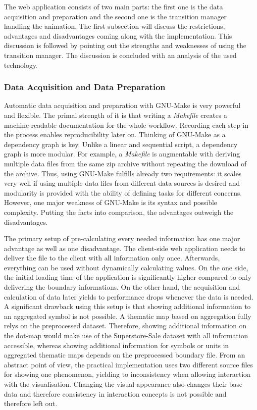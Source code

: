 The web application consists of two main parts: the first one is the data acquisition and preparation and the second one is the transition manager handling the animation. The first subsection will discuss the restrictions, advantages and disadvantages coming along with the implementation. This discussion is followed by pointing out the strengths and weaknesses of using the transition manager. The discussion is concluded with an analysis of the used technology.

\subsubsection{Data Acquisition and Data Preparation}
Automatic data acquisition and preparation with GNU-Make is very powerful and flexible. The primal strength of it is that writing a \textit{Makefile} creates a machine-readable documentation for the whole workflow. Recording each step in the process enables reproducibility later on.
Thinking of GNU-Make as a dependency graph is key. Unlike a linear and sequential script, a dependency graph is more modular. For example, a \textit{Makefile} is augmentable with deriving multiple data files from the same zip archive without repeating the download of the archive. Thus, using GNU-Make fulfills already two requirements: it scales very well if using multiple data files from different data sources is desired and modularity is provided with the ability of defining tasks for different concerns. However, one major weakness of GNU-Make is its syntax and possible complexity. Putting the facts into comparison, the advantages outweigh the disadvantages.

The primary setup of pre-calculating every needed information has one major advantage as well as one disadvantage. The client-side web application needs to deliver the file to the client with all information only once. Afterwards, everything can be used without dynamically calculating values. On the one side, the initial loading time of the application is significantly higher compared to only delivering the boundary informations. On the other hand, the acquisition and calculation of data later yields to performance drops whenever the data is needed.
A significant drawback using this setup is that showing additional information to an aggregated symbol is not possible. A thematic map based on aggregation fully relys on the preprocessed dataset. Therefore, showing additional information on the dot-map would make use of the Superstore-Sale dataset with all information accessible, whereas showing additional information for symbols or units in aggregated thematic maps depends on the preprocessed boundary file. From an abstract point of view, the practical implementation uses two different source files for showing one phenomenon, yielding to inconsistency when allowing interaction with the visualisation. Changing the visual appearance also changes their base-data and therefore consistency in interaction concepts is not possible and therefore left out.

